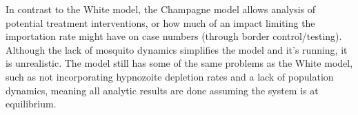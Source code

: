 In contrast to the White model, the Champagne model allows analysis of
potential treatment interventions, or how much of an impact limiting the
importation rate might have on case numbers (through border control/testing).
Although the lack of mosquito dynamics simplifies the model and it's running,
it is unrealistic. The model still has some of the same problems as the White
model, such as not incorporating hypnozoite depletion rates and a lack of
population dynamics, meaning all analytic results are done assuming the system
is at equilibrium.